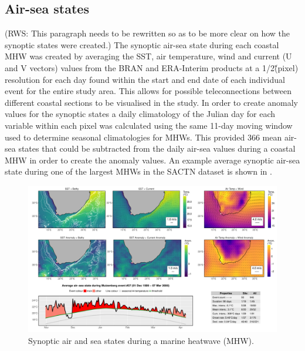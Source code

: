 \documentclass[a4paper,10pt,review]{elsarticle}
\begin{document}
\subsection{Air-sea states}
(RWS: This paragraph needs to be rewritten so as to be more clear on how the synoptic states were created.)
The synoptic air-sea state during each coastal MHW was created by averaging the SST, air temperature, wind and current (U and V vectors) values from the BRAN and ERA-Interim products at a 1/2\degree\~ (pixel) resolution for each day found within the start and end date of each individual event for the entire study area. This allows for possible teleconnections between different coastal sections to be visualised in the study. In order to create anomaly values for the synoptic states a daily climatology of the Julian day for each variable within each pixel was calculated using the same 11-day moving window used to determine seasonal climatologies for MHWs. This provided 366 mean air-sea states that could be subtracted from the daily air-sea values during a coastal MHW in order to create the anomaly values. An example average synoptic air-sea state during one of the largest MHWs in the SACTN dataset is shown in .

\begin{figure}
\includegraphics[width=1.0\textwidth]{figure_2.pdf}
\caption{Synoptic air and sea states during a marine heatwave (MHW).}
\label{figure2}
\end{figure}
\end{document}
